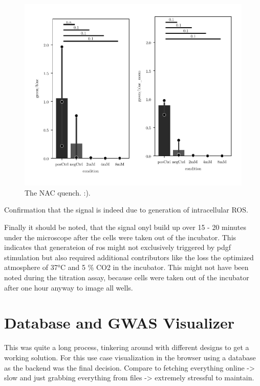     \begin{figure}[h]
    \capstart
        \centering
    	\includegraphics{Abbildung/NAC_quench.pdf}

    	\begin{minipage}{\captionwidth}
    		\caption[NAC quench]{ \newline The NAC quench. :).}
    		\label{fig:qPCR}
    	\end{minipage}
    \end{figure}

    Confirmation that the signal is indeed due to generation of intracellular ROS.

    Finally it should be noted, that the signal onyl build up over 15 - 20 minutes under the microscope after the cells were taken out of the incubator. This indicates that generateion of \ac{ros} might not exclusively triggered by \ac{pdgf} stimulation but also required additional contributors like the loss the optimized atmosphere of 37°C and 5 \% CO2 in the incubator. This might not have been noted during the titration assay, because cells were taken out of the incubator after one hour anyway to image all wells.

\section{Database and GWAS Visualizer}
This was quite a long process, tinkering around with different designs to get a working solution. For this use case visualization in the browser using a database as the backend was the final decision. Compare to fetching everything online -> slow and just grabbing everything from files -> extremely stressful to maintain.

